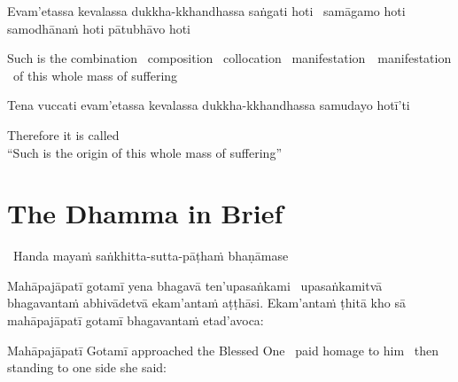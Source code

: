 \ifninebythirteen\clearpage\fi

\begin{pali-hang}
  Evam'etassa kevalassa dukkha-kkhandhassa saṅgati hoti \breathmark\ samāgamo hoti samodhānaṁ hoti pātubhāvo hoti
\end{pali-hang}

\begin{english-hang}
  Such is the combination \breathmark\ composition \breathmark\ collocation \breathmark\ \ifbfive \mbox{manifestation}~\breathmark\ \else manifestation \breathmark\ \fi of this whole mass of suffering
\end{english-hang}

\begin{pali-hang}
  Tena vuccati evam'etassa kevalassa dukkha-kkhandhassa samudayo hotī'ti
\end{pali-hang}

\begin{english}
  Therefore it is called\\
  ``Such is the origin of this whole mass of suffering''
\end{english}

\suttaRef{[Vibh 6 / SN 12.2]}

\ifdigital{}\fi



\section{The Dhamma in Brief}
\label{dhamma-in-brief}

\begin{leader}
  \anglebracketleft\ \hspace{-0.5mm}Handa mayaṁ saṅkhitta-sutta-pāṭhaṁ bhaṇāmase \hspace{-0.5mm}\anglebracketright\
\end{leader}

\begin{pali-hang}
  Mahāpajāpatī gotamī yena bhagavā ten'upasaṅkami \breathmark\ upasaṅkamitvā bhagavantaṁ abhivādetvā ekam'antaṁ aṭṭhāsi. Ekam'antaṁ ṭhitā kho sā mahāpajāpatī gotamī bhagavantaṁ etad'avoca:
\end{pali-hang}

\begin{english-hang}
  Mahāpajāpatī Gotamī approached the Blessed One \breathmark\ paid homage to him \breathmark\ then standing to one side she said:
\end{english-hang}

